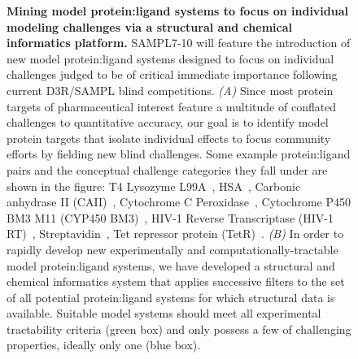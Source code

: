 \documentclass[11pt]{article}
\begin{document}
\begin{figure}[h]
\begin{centering}
\end{centering}
\vspace{0.1in}
\caption{\footnotesize {\bf Mining model protein:ligand systems to focus on individual modeling challenges via a structural and chemical informatics platform.}
SAMPL7-10 will feature the introduction of new model protein:ligand systems designed to focus on individual challenges judged to be of critical immediate importance following current D3R/SAMPL blind competitions. 
\emph{(A)} Since most protein targets of pharmaceutical interest feature a multitude of conflated challenges to quantitative accuracy, our goal is to identify model protein targets that isolate individual effects to focus community efforts by fielding new blind challenges. Some example protein:ligand pairs and the conceptual challenge categories they fall under are shown in the figure: 
T4 Lysozyme L99A~\cite{mobley_predicting_2007}, HSA~\cite{Martin:2009:JournalofComputer-AidedMolecularDesign}, Carbonic anhydrase II (CAII)~\cite{Martin:2009:JournalofComputer-AidedMolecularDesign,Temperini:2009:Bioorganic&MedicinalChemistry}, Cytochrome C Peroxidase~\cite{Rocklin:2013:JournalofMolecularBiology}, Cytochrome P450 BM3 M11 (CYP450 BM3)~\cite{Venkataraman:2014:Bioorganic&MedicinalChemistry}, HIV-1 Reverse Transcriptase (HIV-1 RT)~\cite{Gunasekaran:2007:JournalofMolecularBiology,Khunnawutmanotham:2009:BeilsteinJournalofOrganicChemistry}, Streptavidin~\cite{Gunasekaran:2007:JournalofMolecularBiology}, Tet repressor protein (TetR)~\cite{Gunasekaran:2007:JournalofMolecularBiology,Aleksandrov:2007:ChemBioChem}.
\emph{(B)} In order to rapidly develop new experimentally and computationally-tractable model protein:ligand systems, we have developed a structural and chemical informatics system that applies successive filters to the set of all potential protein:ligand systems for which structural data is available. Suitable model systems should meet all experimental tractability criteria (green box) and only possess a few of challenging properties, ideally only one (blue box).
\vspace{-0.1in}
\label{figure:mining-for-model-systems}}
\end{figure}
\end{document}
